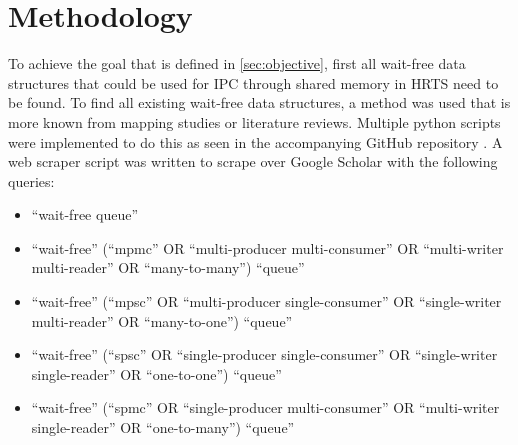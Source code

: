 \chapter{Methodology}\label{ch:methodology}
To achieve the goal that is defined in \cref{sec:objective}, first all wait-free data structures that could be used for \ac{IPC} through shared memory in \ac{HRTS} need to be found. To find all existing wait-free data structures, a method was used that is more known from mapping studies or literature reviews. Multiple python scripts were implemented to do this as seen in the accompanying GitHub repository \cite{githubMA}. A web scraper script was written to scrape over Google Scholar with the following queries:
\begin{itemize}
   \item \enquote{wait-free queue}
   \item \enquote{wait-free} (\enquote{mpmc} OR \enquote{multi-producer multi-consumer} OR \enquote{multi-writer multi-reader} OR \enquote{many-to-many}) \enquote{queue}
   \item \enquote{wait-free} (\enquote{mpsc} OR \enquote{multi-producer single-consumer} OR \enquote{single-writer multi-reader} OR \enquote{many-to-one}) \enquote{queue}
   \item \enquote{wait-free} (\enquote{spsc} OR \enquote{single-producer single-consumer} OR \enquote{single-writer single-reader} OR \enquote{one-to-one}) \enquote{queue}
   \item \enquote{wait-free} (\enquote{spmc} OR \enquote{single-producer multi-consumer} OR \enquote{multi-writer single-reader} OR \enquote{one-to-many}) \enquote{queue}
\end{itemize}
